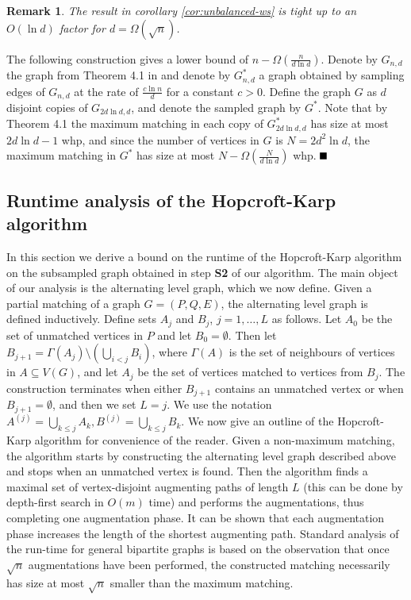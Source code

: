 \documentclass[11pt]{article}
\newcommand{\qed}{\mbox{}\hspace*{\fill}\nolinebreak\mbox{$\rule{0.6em}{0.6em}$}
}
\newtheorem{remark}[theorem]{Remark}
\newenvironment{proof}{{\bf Proof:}}{$\qed$\par}
\begin{document}
\begin{remark} \label{rmk:logd}
The result in corollary \ref{cor:unbalanced-ws} is tight up to an $O(\ln d)$ factor for $d=\Omega(\sqrt{n})$. 
\end{remark}
\begin{proof}
The following construction gives a lower bound of $n-\Omega\left(\frac{n}{d\ln d}\right)$. Denote by $G_{n, d}$ the graph from Theorem 4.1 in \cite{gkk:rbp08} and denote by $G^*_{n, d}$ a graph obtained by sampling edges of $G_{n, d}$ at the rate of $\frac{c\ln n}{d}$ for a constant $c>0$. Define the graph $G$ as $d$ disjoint copies of $G_{2d\ln d, d}$, and denote the sampled graph by $G^*$. Note that by Theorem 4.1 the maximum matching in each copy of $G^*_{2d\ln d, d}$ has size at most $2d \ln d-1$ whp, and since the number of vertices in $G$ is $N=2d^2\ln d$, the maximum matching in $G^*$ has size at most $N-\Omega\left(\frac{N}{d\ln d}\right)$ whp.
\end{proof}

\subsection{Runtime analysis of the Hopcroft-Karp algorithm}
In this section we derive a bound on the runtime of the Hopcroft-Karp algorithm on the subsampled graph obtained in step \textbf{S2} of our algorithm.
The main object of our analysis is the alternating level graph, which we now define. Given a partial matching of a graph $G=(P, Q, E)$, the alternating level graph is defined inductively. Define sets $A_j$ and $B_j$, $j=1,\ldots, L$ as follows. Let $A_0$ be the set of unmatched vertices in $P$ and let $B_0=\emptyset$. Then let $B_{j+1}=\Gamma(A_j)\setminus \left(\bigcup_{i<j} B_{i}\right)$, where  $\Gamma(A)$ is the set of neighbours of vertices in $A\subseteq V(G)$, and let $A_j$ be the set of vertices matched to vertices from $B_j$. The construction terminates when either $B_{j+1}$ contains an unmatched vertex or when $B_{j+1}=\emptyset$, and then we set $L=j$. We use the notation $A^{(j)}=\bigcup_{k\leq j} A_k, B^{(j)}=\bigcup_{k\leq j} B_k$. 
We now give an outline of the Hopcroft-Karp algorithm for convenience of the reader. Given a non-maximum matching, the algorithm starts by constructing the alternating level graph described above and stops when an unmatched vertex is found. Then the algorithm finds a maximal set of vertex-disjoint augmenting paths of length $L$ (this can be done by depth-first search in $O(m)$ time) and performs the augmentations, thus completing one augmentation phase. It can be shown that each augmentation phase increases the length of the shortest augmenting path. Standard analysis of the run-time for general bipartite graphs is based on the observation that once $\sqrt{n}$ augmentations have been performed, the constructed matching necessarily has size at most $\sqrt{n}$ smaller than the maximum matching.  
\end{document}
